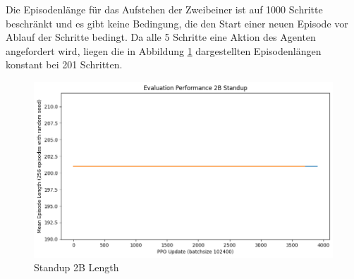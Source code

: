 Die Episodenlänge für das Aufstehen der Zweibeiner ist auf 1000 Schritte beschränkt und es gibt keine Bedingung, die den Start einer neuen Episode vor Ablauf der Schritte bedingt. Da alle 5 Schritte eine Aktion des Agenten angefordert wird, liegen die in Abbildung \ref{fig:Standup2B_Length} dargestellten Episodenlängen konstant bei 201 Schritten.

\begin{figure}[ht]
    \centering
    \includegraphics[width=0.5\linewidth]{resources/img/results/Standup2B_Length.png}
    \caption{Standup 2B Length}\label{fig:Standup2B_Length}
\end{figure}

